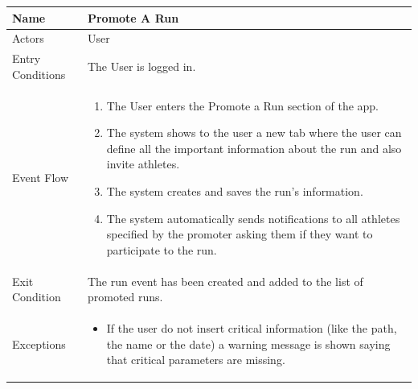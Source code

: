 \begin{enumerate}
\FloatBarrier
\begin{table}[h]
\begin{tabular}{|l|p{}|}
\hline
Name             & Promote A Run \\ \hline
Actors           & User  \\ \hline
Entry Conditions & The User is logged in.    \\ \hline
Event Flow       & \begin{enumerate}
            \item The User enters the Promote a Run section of the app.
            \item The system shows to the user a new tab where the user can define all the important information about the run and also invite athletes.
            \item The system creates and saves the run's information.
            \item The system automatically sends notifications to all athletes specified by the promoter asking them if they want to participate to the run.
        \end{enumerate}\\ \hline
Exit Condition   & The run event has been created and added to the list of promoted runs.\\ \hline
Exceptions       & \begin{itemize}
\item If the user do not insert critical information (like the path, the name or the date) a warning message is shown saying that critical parameters are missing.
\end{itemize}\\ \hline
\end{tabular}
\end{table}
\FloatBarrier


\end{enumerate}

